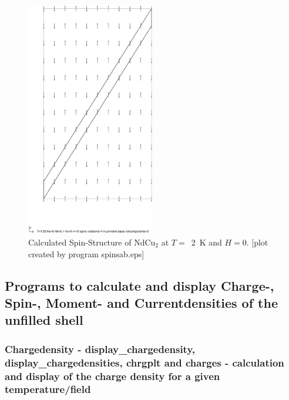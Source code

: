 \begin{figure}[hb]%
\begin{center}\leavevmode
\includegraphics[angle=0, width=0.5\textwidth]{../examples/ndcu2b/resultss/spinsab.eps}
\end{center}
\caption{Calculated Spin-Structure of NdCu$_2$ at $T=$~2~K and $H=0$.
[plot created by program {\prg spinsab.eps}]}
\label{spingraphic}
\end{figure}

\subsection{Programs to calculate and display Charge-, Spin-, Moment- and Currentdensities
of the unfilled shell}

\subsubsection{Chargedensity - {\prg display\_chargedensity},
{\prg display\_chargedensities},
{\prg chrgplt} and  {\prg charges} - calculation and display of
the charge density for a given temperature/field}
\label{charges}

